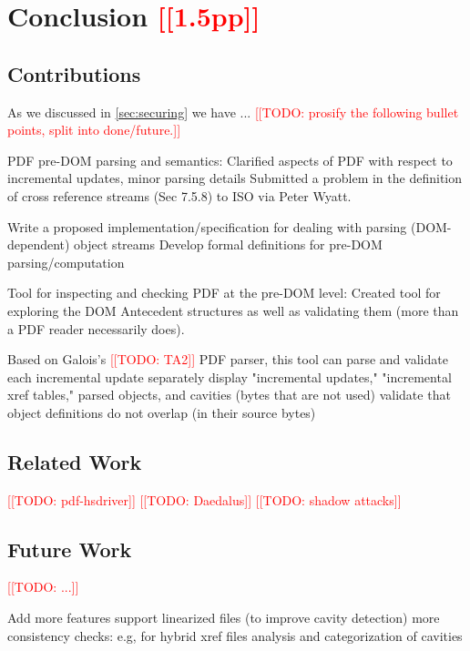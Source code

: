 \documentclass[conference,12pt]{IEEEtran}
\newcommand{\note}[1]{\noteYes{#1}}
\newcommand{\noteYes}[1]{\textcolor{red}{[[#1]]}}
\newcommand{\todo}[1]{\note{TODO: #1}}
\begin{document}
\section{Conclusion \note{1.5pp}}
\label{sec:conclusion}

\subsection{Contributions}

As we discussed in \cref{sec:securing} we have ...
\todo{prosify the following bullet points, split into done/future.}


PDF pre-DOM parsing and semantics:
Clarified aspects of PDF with respect to incremental updates, minor parsing details
Submitted a problem in the definition of cross reference streams (Sec 7.5.8) to
ISO via Peter Wyatt.

Write a proposed implementation/specification for dealing with parsing (DOM-dependent) object streams
Develop formal definitions for pre-DOM parsing/computation

Tool for inspecting and checking PDF at the pre-DOM level:
Created tool for exploring the DOM Antecedent structures as well as validating
them (more than a PDF reader necessarily does).

Based on Galois's \todo{TA2} PDF parser, this tool can
parse and validate each incremental update separately
display "incremental updates," "incremental xref tables," parsed objects, and cavities (bytes that are not used)
validate that object definitions do not overlap (in their source bytes)
      
\subsection{Related Work}

\todo{pdf-hsdriver} 
\todo{Daedalus}
\todo{shadow attacks}
      
\subsection{Future Work}
\todo{...}

Add more features
support linearized files (to improve cavity detection)
more consistency checks: e.g, for hybrid xref files
analysis and categorization of cavities


\end{document}
